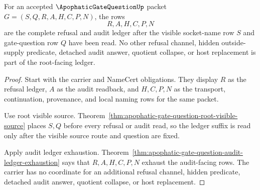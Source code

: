 \begin{theorem}
\label{thm:apophatic-gate-question-root-refusal-audit-ledger}
For an accepted $\ApophaticGateQuestionUp$ packet $G=(S,Q,R,A,H,C,P,N)$, the rows
$$
R,A,H,C,P,N
$$
are the complete refusal and audit ledger after the visible socket-name row $S$ and gate-question row $Q$ have been read. No other refusal channel, hidden outside-supply predicate, detached audit answer, quotient collapse, or host replacement is part of the root-facing ledger.
\end{theorem}
\begin{proof}
Start with the carrier and NameCert obligations. They display $R$ as the refusal ledger, $A$ as the audit readback, and $H,C,P,N$ as the transport, continuation, provenance, and local naming rows for the same packet.

Use root visible source. Theorem~\ref{thm:apophatic-gate-question-root-visible-source} places $S,Q$ before every refusal or audit read, so the ledger suffix is read only after the visible source route and question are fixed.

Apply audit ledger exhaustion. Theorem~\ref{thm:apophatic-gate-question-audit-ledger-exhaustion} says that $R,A,H,C,P,N$ exhaust the audit-facing rows. The carrier has no coordinate for an additional refusal channel, hidden predicate, detached audit answer, quotient collapse, or host replacement.
\end{proof}

